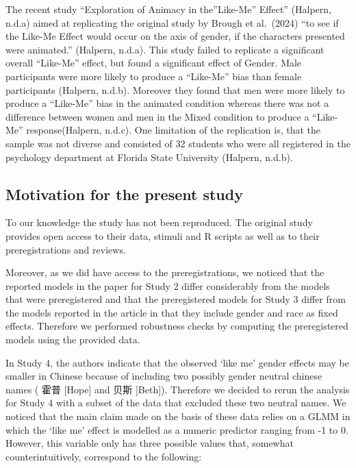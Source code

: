 \documentclass[
  letterpaper,
  DIV=11,
  numbers=noendperiod]{scrartcl}
\begin{document}
The recent study ``Exploration of Animacy in the''Like-Me'' Effect''
(Halpern, n.d.a) aimed at replicating the original study by Brough et
al.~(2024) ``to see if the Like-Me Effect would occur on the axis of
gender, if the characters presented were animated.'' (Halpern, n.d.a).
This study failed to replicate a significant overall ``Like-Me'' effect,
but found a significant effect of Gender. Male participants were more
likely to produce a ``Like-Me'' bias than female participants (Halpern,
n.d.b). Moreover they found that men were more likely to produce a
``Like-Me'' bias in the animated condition whereas there was not a
difference between women and men in the Mixed condition to produce a
``Like-Me'' response(Halpern, n.d.c). One limitation of the replication
is, that the sample was not diverse and consisted of 32 students who
were all registered in the psychology department at Florida State
University (Halpern, n.d.b).

\subsection{Motivation for the present
study}\label{motivation-for-the-present-study}

To our knowledge the study has not been reproduced. The original study
provides open access to their data, stimuli and R scripts as well as to
their preregistrations and reviews.

Moreover, as we did have access to the preregistrations, we noticed that
the reported models in the paper for Study 2 differ considerably from
the models that were preregistered and that the preregistered models for
Study 3 differ from the models reported in the article in that they
include gender and race as fixed effects. Therefore we performed
robustness checks by computing the preregistered models using the
provided data.

In Study 4, the authors indicate that the observed `like me' gender
effects may be smaller in Chinese because of including two possibly
gender neutral chinese names ( 霍普 {[}Hope{]} and 贝斯 {]}Beth{]}).
Therefore we decided to rerun the analysis for Study 4 with a subset of
the data that excluded these two neutral names. We noticed that the main
claim made on the basis of these data relies on a GLMM in which the
`like me' effect is modelled as a numeric predictor ranging from -1 to
0. However, this variable only has three possible values that, somewhat
counterintuitively, correspond to the following:~
\end{document}
